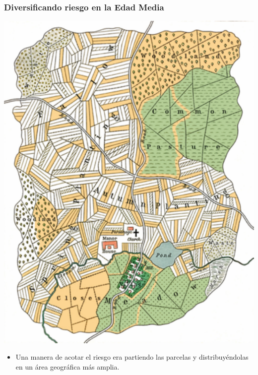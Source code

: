 \documentclass{beamer}
\begin{document}
\begin{frame}
\frametitle{Diversificando riesgo en la Edad Media}
\centering
\includegraphics[scale=0.4]{Slides Principios de Economia/PastedGraphic-1.pdf}

\begin{itemize}
    \item Una manera de acotar el riesgo era partiendo las parcelas y distribuyéndolas en un área geográfica más amplia. 
\end{itemize}
\end{frame}
\end{document}
